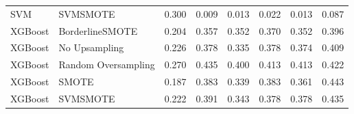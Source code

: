 \begin{tabular}{llllllll}
                            SVM &                      SVMSMOTE & 0.300 &                     0.009 &                 0.013 &                  0.022 &                                   0.013 &     0.087 \\
                        XGBoost &               BorderlineSMOTE & 0.204 &                     0.357 &                 0.352 &                  0.370 &                                   0.352 &     0.396 \\
                        XGBoost &                 No Upsampling & 0.226 &                     0.378 &                 0.335 &                  0.378 &                                   0.374 &     0.409 \\
                        XGBoost &           Random Oversampling & 0.270 &                     0.435 &                 0.400 &                  0.413 &                                   0.413 &     0.422 \\
                        XGBoost &                         SMOTE & 0.187 &                     0.383 &                 0.339 &                  0.383 &                                   0.361 &     0.443 \\
                        XGBoost &                      SVMSMOTE & 0.222 &                     0.391 &                 0.343 &                  0.378 &                                   0.378 &     0.435 \\
\bottomrule
\end{tabular}
